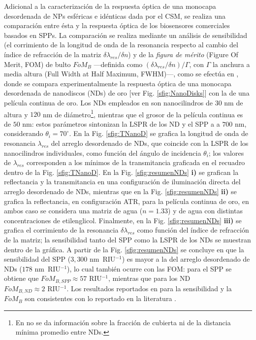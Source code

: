 Adicional a la caracterización de la respuesta óptica de una monocapa desordenada de NPs esféricas e idénticas dada por el CSM, se realiza una comparación entre ésta y la respuesta óptica de los biosensores comerciales basados en SPPs. La comparación se realiza mediante un análisis de sensibilidad (el corrimiento de la longitud de onda de la resonancia respecto al cambio del índice de refracción de la matriz $\delta\lambda_{res}/\delta n$) y de la \emph{figura de mérito} (Figure Of Merit, FOM) de bulto $\textit{FoM}_B$ ---definida como $(\delta\lambda_{res}/\delta n)/\Gamma$, con $\Gamma$ la anchura a media altura (Full Width at Half Maximum, FWHM)---, como se  efectúa en \cite{svedendahl2009refractometric}, donde se compara experimentalmente la respuesta óptica de una monocapa desordenada de nanodiscos (NDs)  de oro [ver Fig. \ref{sfig:NanoDisks}] con la de una película continua de oro. Los NDs empleados en \cite{svedendahl2009refractometric} son nanocilindros de $30$ nm de altura y  $120$ nm de diámetro\footnote{En \cite{svedendahl2009refractometric} no se da información sobre la fracción de cubierta ni de la distancia mínima promedio entre NDs.}, mientras que el grosor de la película continua es de $50$ nm: estos parámetros sintonizan la LSPR de los ND y el SPP a  a $700$ nm, considerando $\theta_i=70^\circ$. En la Fig. \ref{sfig:TNanoD} se grafica la longitud de onda de resonancia  $\lambda_{res}$ del arreglo desordenado de NDs, que coincide con la LSPR de los nanocilindros individuales, como función del ángulo de incidencia $\theta_i$; los valores de $\lambda_{res}$ corresponden a los mínimos de la transmitancia graficada en el recuadro dentro de la Fig. \ref{sfig:TNanoD}. En la Fig. \ref{sfig:resumenNDs} \textbf{i)} se grafican la reflectancia y la transmitancia  en una configuración de iluminación directa del arreglo desordenado de NDs, mientras que en la Fig. \ref{sfig:resumenNDs} \textbf{ii)} se grafica la reflectancia, en configuración ATR, para la película continua de oro, en ambos caso se considera una matriz de agua ($n=1.33$) y de agua con distintas concentraciones de etilenglicol. Finalmente, en la Fig. \ref{sfig:resumenNDs} \textbf{iii)} se grafica el corrimiento de la resonancia $\delta\lambda_{res}$ como función del índice de refracción de la matriz; la sensibilidad tanto del SPP como la LSPR de los NDs se muestran dentro de la gráfica. A partir de la Fig. \ref{sfig:resumenNDs} se concluye en \cite{svedendahl2009refractometric} que la sensibilidad del SPP ($3,300$ nm~\mbox{RIU$^{-1}$}) es mayor a la del arreglo desordenado de NDs ($178$ nm~\mbox{RIU$^{-1}$}), lo cual también ocurre con las FOM: para el SPP se obtiene que $\textit{FoM}_{B,\textit{SPP}}\approx 57 \mbox{ RIU$^{-1}$}$, mientras que para los ND $\textit{FoM}_{B,\textit{ND}}\approx 2\mbox{ RIU$^{-1}$}$. Los resultados reportados en \cite{svedendahl2009refractometric} para la sensibilidad y la $\textit{FoM}_B$ son consistentes con lo reportado en la literatura \cite{brian2009sensitivity,cahill1997surface}.
 
